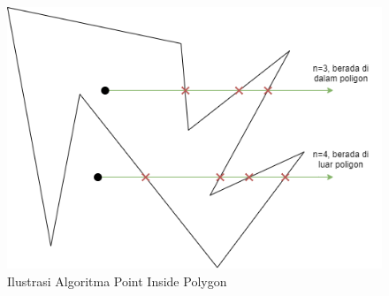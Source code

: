 \begin{figure}[!h]
	\Centering
	\includegraphics [width=0.5\columnwidth]{bab2/img/ilustrasi-algoritma-point-inside-polygon}
	\caption {Ilustrasi Algoritma Point Inside Polygon}
	\label {fig:ilustrasi-algoritma-point-inside-polygon}
\end{figure}
